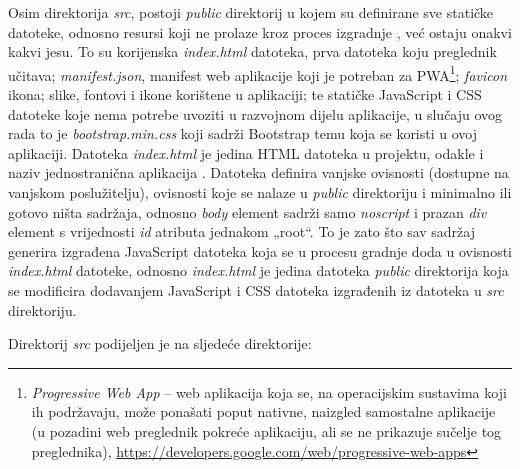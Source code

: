\documentclass[times, utf8, diplomski, numeric]{fer}
\newcommand{\razmakp}{\vspace{18pt}}
\begin{document}
\razmakp

Osim direktorija \emph{src}, postoji \emph{public} direktorij u kojem su definirane sve statičke datoteke, odnosno resursi koji ne prolaze kroz proces izgradnje , već ostaju onakvi kakvi jesu.
To su korijenska \emph{index.html} datoteka, prva datoteka koju preglednik učitava; \emph{manifest.json}, manifest web aplikacije koji je potreban za PWA\footnote{
    \emph{Progressive Web App} -- web aplikacija koja se, na operacijskim sustavima koji ih podržavaju, može ponašati poput nativne, naizgled samostalne aplikacije (u pozadini web preglednik pokreće aplikaciju, ali se ne prikazuje sučelje tog preglednika), \url{https://developers.google.com/web/progressive-web-apps}
}; \emph{favicon} ikona; slike, fontovi i ikone korištene u aplikaciji; te statičke JavaScript i CSS datoteke koje nema potrebe uvoziti u razvojnom dijelu aplikacije, u slučaju ovog rada to je \emph{bootstrap.min.css} koji sadrži Bootstrap temu koja se koristi u ovoj aplikaciji.
Datoteka \emph{index.html} je jedina HTML datoteka u projektu, odakle i naziv jednostranična aplikacija .
Datoteka definira vanjske ovisnosti (dostupne na vanjskom poslužitelju), ovisnosti koje se nalaze u \emph{public} direktoriju i minimalno ili gotovo ništa sadržaja, odnosno \emph{body} element sadrži samo \emph{noscript} i prazan \emph{div} element s vrijednosti \emph{id} atributa jednakom „root“.
To je zato što sav sadržaj generira izgrađena JavaScript datoteka koja se u procesu gradnje doda u ovisnosti \emph{index.html} datoteke, odnosno \emph{index.html} je jedina datoteka \emph{public} direktorija koja se modificira dodavanjem JavaScript i CSS datoteka izgrađenih iz datoteka u \emph{src} direktoriju.

\razmakp

\noindent Direktorij \emph{src} podijeljen je na sljedeće direktorije:
\end{document}
